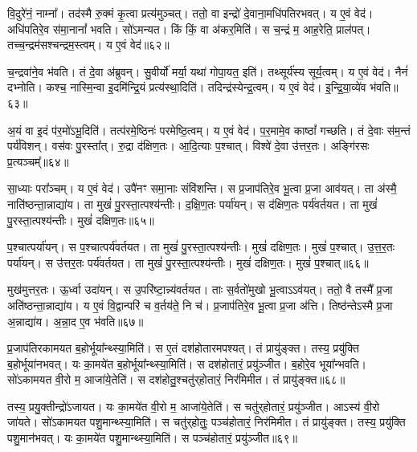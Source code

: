 वि॒दुरे॑नं॒ नाम्ना᳚।
तद॑स्मै रु॒क्मं कृ॒त्वा प्रत्य॑मुञ्चत्।
ततो॒ वा इन्द्रो॑ दे॒वाना॒मधि॑पतिरभवत्।
य ए॒वं वेद॑।
अधि॑पतिरे॒व स॑मा॒नानां᳚ भवति।
सो॑ऽमन्यत।
किं किं॒ वा अ॑कर॒मिति॑।
स च॒न्द्रं म॒ आह॒रेति॒ प्राल॑पत्।
तच्च॒न्द्रम॑सश्चन्द्रम॒स्त्वम्।
य ए॒वं वेद॑॥६२॥\ip

च॒न्द्रवा॑ने॒व भ॑वति।
तं दे॒वा अ॑ब्रुवन्।
सु॒वीर्यो॑ मर्या॒ यथा॑ गोपा॒यत॒ इति॑।
तथ्सूर्य॑स्य सूर्य॒त्वम्।
य ए॒वं वेद॑।
नैनं॑ दभ्नोति।
कश्च॒ नास्मि॒न्वा इ॒दमि॑न्द्रि॒यं प्रत्य॑स्था॒दिति॑।
तदिन्द्र॑स्येन्द्र॒त्वम्।
य ए॒वं वेद॑।
इ॒न्द्रि॒या॒व्ये॑व भ॑वति॥६३॥\ip

अ॒यं वा इ॒दं प॑र॒मो॑\-ऽभू॒दिति॑।
तत्प॑रमे॒ष्ठिनः॑ परमेष्ठि॒त्वम्।
य ए॒वं वेद॑।
प॒र॒मामे॒व काष्ठां᳚ गच्छति।
तं दे॒वाः स॑म॒न्तं पर्य॑विशन्।
वस॑वः पु॒रस्ता᳚त्।
रु॒द्रा द॑क्षिण॒तः।
आ॒दि॒त्याः प॒श्चात्।
विश्वे॑ दे॒वा उ॑त्तर॒तः।
अङ्गि॑रसः प्र॒त्यञ्चम्᳚॥६४॥\ip

सा॒ध्याः परा᳚ञ्चम्।
य ए॒वं वेद॑।
उपै॑नꣳ समा॒नाः संवि॑शन्ति।
स प्र॒जा\-प॑तिरे॒व भू॒त्वा प्र॒जा आव॑यत्।
ता अ॑स्मै॒ नाति॑ष्ठन्ता॒न्नाद्या॑य।
ता मुखं॑ पु॒रस्ता॒त्पश्य॑न्तीः।
द॒क्षि॒ण॒तः पर्या॑यन्।
स द॑क्षिण॒तः पर्य॑वर्तयत।
ता मुखं॑ पु॒रस्ता॒त्पश्य॑न्तीः।
मुखं॑ दक्षिण॒तः॥६५॥\ip

प॒श्चात्पर्या॑यन्।
स प॒श्चात्पर्य॑वर्तयत।
ता मुखं॑ पु॒रस्ता॒त्पश्य॑न्तीः।
मुखं॑ दक्षिण॒तः।
मुखं॑ प॒श्चात्।
उ॒त्त॒र॒तः पर्या॑यन्।
स उ॑त्तर॒तः पर्य॑वर्तयत।
ता मुखं॑ पु॒रस्ता॒त्पश्य॑न्तीः।
मुखं॑ दक्षिण॒तः।
मुखं॑ प॒श्चात्॥६६॥\ip

मुख॑मुत्तर॒तः।
ऊ॒र्ध्वा उदा॑यन्।
स उ॒परि॑ष्टा॒न्न्य॑वर्तयत।
ताः स॒र्वतो॑मुखो भू॒त्वा\-ऽऽव॑यत्।
ततो॒ वै तस्मै᳚ प्र॒जा अति॑ष्ठन्ता॒न्नाद्या॑य।
य ए॒वं वि॒द्वान्परि॑ च व॒र्तय॑ते॒ नि च॑।
प्र॒जा\-प॑तिरे॒व भू॒त्वा प्र॒जा अ॑त्ति।
तिष्ठ॑न्ते\-ऽस्मै प्र॒जा अ॒न्नाद्या॑य।
अ॒न्ना॒द ए॒व भ॑वति॥६७॥\ip\anuvakamend[आ॒सी॒द्वेद॑ चन्द्रम॒स्त्वं य ए॒वं वेदे᳚न्द्रिया॒व्ये॑व भ॑वति प्र॒त्यञ्चं॒ मुखं॑ दक्षिण॒तो मुखं॑ प॒श्चान्नव॑ च]

प्र॒जा\-प॑तिरकामयत ब॒होर्भूया᳚न्थ्स्या॒मिति॑।
स ए॒तं दश॑होतारमपश्यत्।
तं प्रायु॑ङ्क्त।
तस्य॒ प्रयु॑क्ति ब॒होर्भूया॑नभवत्।
यः का॒मये॑त ब॒होर्भूया᳚न्थ्स्या॒मिति॑।
स दश॑होतारं॒ प्रयु॑ञ्जीत।
ब॒होरे॒व भूया᳚न्भवति।
सो॑ऽकामयत वी॒रो म॒ आजा॑ये॒तेति॑।
स दश॑होतु॒श्चतु॑र्‌\mbox{}होतारं॒ निर॑मिमीत।
तं प्रायु॑ङ्क्त॥६८॥\ip

तस्य॒ प्रयु॒क्तीन्द्रो॑\-ऽजायत।
यः का॒मये॑त वी॒रो म॒ आजा॑ये॒तेति॑।
स चतु॑र्‌\mbox{}होतारं॒ प्रयु॑ञ्जीत।
आऽस्य॑ वी॒रो जा॑यते।
सो॑ऽकामयत पशु॒मान्थ्स्या॒मिति॑।
स चतु॑र्‌\mbox{}होतुः॒ पञ्च॑होतारं॒ निर॑मिमीत।
तं प्रायु॑ङ्क्त।
तस्य॒ प्रयु॑क्ति पशु॒मान॑भवत्।
यः का॒मये॑त पशु॒मान्थ्स्या॒मिति॑।
स पञ्च॑होतारं॒ प्रयु॑ञ्जीत॥६९॥\ip

